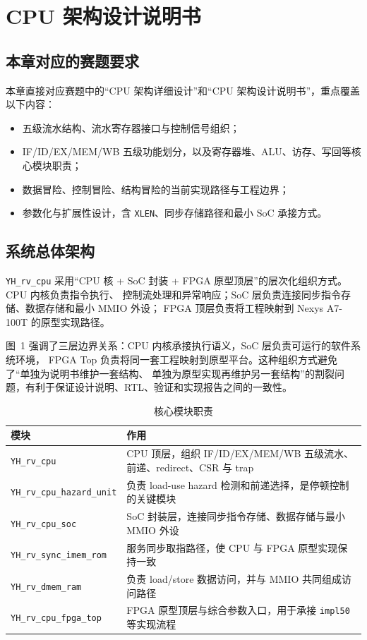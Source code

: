 \section{CPU 架构设计说明书}

\subsection{本章对应的赛题要求}

本章直接对应赛题中的“CPU 架构详细设计”和“CPU 架构设计说明书”，重点覆盖以下内容：
\begin{itemize}
    \item 五级流水结构、流水寄存器接口与控制信号组织；
    \item IF/ID/EX/MEM/WB 五级功能划分，以及寄存器堆、ALU、访存、写回等核心模块职责；
    \item 数据冒险、控制冒险、结构冒险的当前实现路径与工程边界；
    \item 参数化与扩展性设计，含 \texttt{XLEN}、同步存储路径和最小 SoC 承接方式。
\end{itemize}

\subsection{系统总体架构}

\texttt{YH\_rv\_cpu} 采用“CPU 核 + SoC 封装 + FPGA 原型顶层”的层次化组织方式。CPU 内核负责指令执行、
控制流处理和异常响应；SoC 层负责连接同步指令存储、数据存储和最小 MMIO 外设；
FPGA 顶层负责将工程映射到 Nexys A7-100T 的原型实现路径。


图~1 强调了三层边界关系：CPU 内核承接执行语义，SoC 层负责可运行的软件系统环境，
FPGA Top 负责将同一套工程映射到原型平台。这种组织方式避免了“单独为说明书维护一套结构、
单独为原型实现再维护另一套结构”的割裂问题，有利于保证设计说明、RTL、验证和实现报告之间的一致性。

\begin{table}[H]
    \centering
    \small
    \caption{核心模块职责}
    \begin{tabularx}{0.95\textwidth}{L{0.28\textwidth} Y}
        \toprule
        模块 & 作用 \\
        \midrule
        \texttt{YH\_rv\_cpu} & CPU 顶层，组织 IF/ID/EX/MEM/WB 五级流水、前递、redirect、CSR 与 trap \\
        \texttt{YH\_rv\_cpu\_hazard\_unit} & 负责 load-use hazard 检测和前递选择，是停顿控制的关键模块 \\
        \texttt{YH\_rv\_cpu\_soc} & SoC 封装层，连接同步指令存储、数据存储与最小 MMIO 外设 \\
        \texttt{YH\_rv\_sync\_imem\_rom} & 服务同步取指路径，使 CPU 与 FPGA 原型实现保持一致 \\
        \texttt{YH\_rv\_dmem\_ram} & 负责 load/store 数据访问，并与 MMIO 共同组成访问路径 \\
        \texttt{YH\_rv\_cpu\_fpga\_top} & FPGA 原型顶层与综合参数入口，用于承接 \texttt{impl50} 等实现流程 \\
        \bottomrule
    \end{tabularx}
\end{table}

